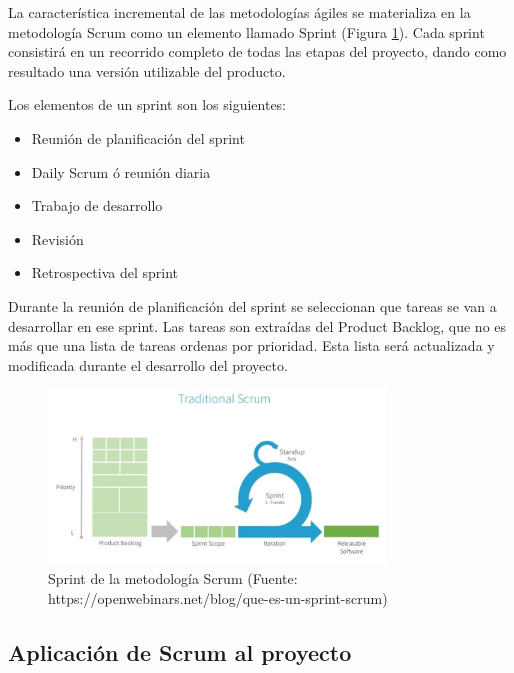 La característica incremental de las metodologías ágiles se materializa en la metodología Scrum como un elemento llamado Sprint (Figura \ref{fig:sprint_scrum}). Cada sprint consistirá en un recorrido completo de todas las etapas del proyecto, dando como resultado una versión utilizable del producto.

Los elementos de un sprint son los siguientes:

\begin{itemize}
    \item Reunión de planificación del sprint
    \item Daily Scrum ó reunión diaria
    \item Trabajo de desarrollo
    \item Revisión
    \item Retrospectiva del sprint
\end{itemize}

Durante la reunión de planificación del sprint se seleccionan que tareas se van a desarrollar en ese sprint. Las tareas son extraídas del Product Backlog, que no es más que una lista de tareas ordenas por prioridad. Esta lista será actualizada y modificada durante el desarrollo del proyecto.

\begin{figure}[h]
    \centering
    \includegraphics[width=0.8\textwidth]{imagenes/03_Planificacion/sprint_scrum.jpg}
    \caption{Sprint de la metodología Scrum (Fuente: https://openwebinars.net/blog/que-es-un-sprint-scrum)}
    \label{fig:sprint_scrum}
\end{figure}


\subsection{Aplicación de Scrum al proyecto}

